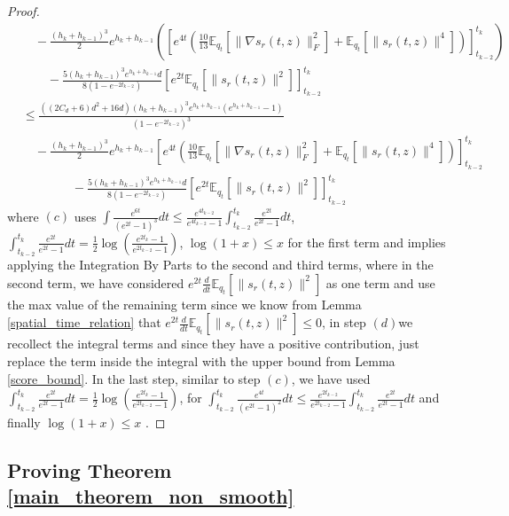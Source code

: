 \documentclass{article}
\begin{document}
\begin{proof}
\begin{align*}
         & \quad-\frac{(h_k+h_{k-1})^3}{2}e^{h_k+h_{k-1}}\left(\left[e^{4t}\left(\frac{10}{13}\mathbb{E}_{q_t}\left[\|\nabla s_r(t,z)\|_F^2\right] +\mathbb{E}_{q_t}[\|s_r(t,z)\|^4] \right) \right]^{t_k}_{t_{k-2}}   \right) 
         \\& \qquad - \frac{5(h_k+h_{k-1})^3e^{h_k+h_{k-1}}d}{8(1-e^{-2t_{k-2}})} \left[ {e^{2t}}\mathbb{E}_{q_t}[\|s_r(t,z)\|^2] \right]^{t_k}_{t_{k-2}} \\
         &\leq \frac{\left((2C_d+6)d^2 +16d\right)(h_k+h_{k-1})^3e^{h_k+h_{k-1}}(e^{h_k+h_{k-1}}-1)}{(1-e^{-2t_{k-2}})^3} \\
         &\quad -\frac{(h_k+h_{k-1})^3}{2}e^{h_k+h_{k-1}}\left[e^{4t}\left(\frac{10}{13}\mathbb{E}_{q_t}\left[\|\nabla s_r(t,z)\|_F^2\right] +\mathbb{E}_{q_t}[\|s_r(t,z)\|^4] \right) \right]^{t_k}_{t_{k-2}}\\
        &\qquad \qquad - \frac{5(h_k+h_{k-1})^3e^{h_k+h_{k-1}}d}{8(1-e^{-2t_{k-2}})} \left[ {e^{2t}}\mathbb{E}_{q_t}[\|s_r(t,z)\|^2] \right]^{t_k}_{t_{k-2}}
    \end{align*}
    where $(c)$  uses $\int\frac{e^{6t}}{(e^{2t}-1)^3}dt \leq \frac{e^{4t_{k-2}}}{e^{4t_{k-2}}-1}\int^{t_k}_{t_{k-2}}\frac{e^{2t}}{e^{2t}-1}dt$, $ \int^{t_k}_{t_{k-2}}\frac{e^{2t}}{e^{2t}-1}dt = \frac{1}{2}\log\left(\frac{e^{2t_k}-1}{e^{2t_{k-2}}-1}\right)$, $\log(1+x)\leq x$ for the first term  and implies applying the Integration By Parts to the second and third terms, where in the second term, we have considered $e^{2t}\frac{d}{dt}\mathbb{E}_{q_t}[\|s_r(t,z)\|^2]$ as one term and use the max value of the remaining term since we know from Lemma \ref{spatial_time_relation} that $e^{2t}\frac{d}{dt}\mathbb{E}_{q_t}[\|s_r(t,z)\|^2] \leq 0$, in step $(d)$we recollect the integral terms and since they have a positive contribution, just replace the term inside the integral with the upper bound from Lemma \ref{score_bound}. In the last step, similar to step $(c)$, we have used $ \int^{t_k}_{t_{k-2}}\frac{e^{2t}}{e^{2t}-1}dt = \frac{1}{2}\log\left(\frac{e^{2t_k}-1}{e^{2t_{k-2}}-1}\right)$, for $\int^{t_k}_{t_{k-2}}\frac{e^{4t}}{(e^{2t}-1)^2}dt \leq \frac{e^{2t_{k-2}}}{e^{2t_{k-2}}-1}\int^{t_k}_{t_{k-2}}\frac{e^{2t}}{e^{2t}-1}dt$ and finally $\log(1+x)\leq x$ . 

\end{proof}


\subsection{Proving Theorem \ref{main_theorem_non_smooth}}
\label{final_theorem_proof}
\end{document}
